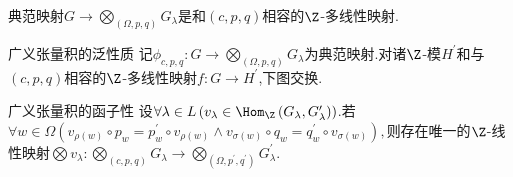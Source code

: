 \begin{proposition}{}{}
	典范映射$G\to\bigotimes\limits_{\left(\Omega,p,q\right)}G_{\lambda}$是和$\left(c,p,q\right)$相容的$\Z$-多线性映射.
\end{proposition}

\begin{proposition}{广义张量积的泛性质}{}
	记$\phi_{c,p,q}:G\to\bigotimes\limits_{\left(\Omega,p,q\right)}G_{\lambda}$为典范映射.对诸$\Z$-模$H^{\prime}$和与$\left(c,p,q\right)$相容的$\Z$-多线性映射$f:G\to H^{\prime}$,下图交换.
	\begin{center}
	\end{center}
\end{proposition}

\begin{proposition}{广义张量积的函子性}{}
	设$\forall\lambda\in L\left(v_{\lambda}\in\Hom_{\Z}\left(G_{\lambda},G_{\lambda}^{\prime}\right)\right)$.若$\forall w\in\Omega\left(v_{\rho\left(w\right)}\circ p_{w}=p_{w}^{\prime}\circ v_{\rho\left(w\right)}\wedge v_{\sigma\left(w\right)}\circ q_{w}=q_{w}^{\prime}\circ v_{\sigma\left(w\right)}\right),$则存在唯一的$\Z$-线性映射$\bigotimes v_{\lambda}:\bigotimes\limits_{\left(c,p,q\right)}G_{\lambda}\to\bigotimes\limits_{\left(\Omega,p^{\prime},q^{\prime}\right)}G_{\lambda}^{\prime}$.
\end{proposition}

